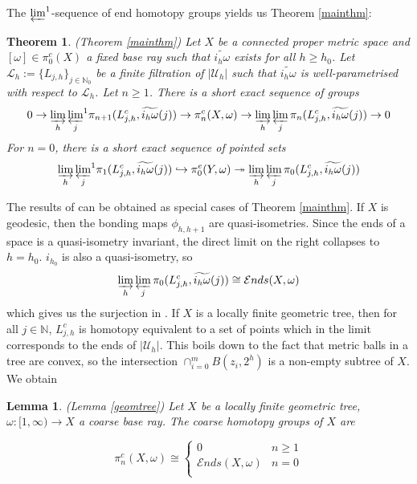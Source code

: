 \documentclass[a4paper,11pt]{article}
\theoremstyle{definition}
\theoremstyle{plain}
\newtheorem*{theorem*}{Theorem}
\newtheorem*{lemma*}{Lemma}
\theoremstyle{remark}
\begin{document}
The $\varprojlim^1$-sequence of end homotopy groups yields us Theorem \ref{mainthm}:


\begin{theorem*} (Theorem \ref{mainthm}) Let $X$ be a connected proper metric space and $[\omega]\in \pi_{0}^{c}(X)$ a fixed base ray such that $\widetilde{i_{h}\omega}$ exists for all $h\geq h_0$.  Let $\mathcal{L}_{h}:=\{L_{j,h}\}_{j\in \mathbb{N}_{0}}$ be a finite filtration of $|\mathcal{U}_{h}|$ such that $\widetilde{i_{h}\omega}$ is well-parametrised with respect to $\mathcal{L}_{h}$. Let $n\geq 1$. There is a short exact sequence of groups 
 \begin{align*}
0\rightarrow  \varinjlim_{h} {\varprojlim_{j}}^{1} \pi_{n+1}(L_{j,h}^c,\widetilde{i_{h}\omega}(j))  \rightarrow  \pi_{n}^c(X,\omega) \rightarrow  \varinjlim_{h} \varprojlim_{j} \pi_{n}(L_{j,h}^c,\widetilde{i_{h}\omega}(j)) \rightarrow 0
\end{align*}
For $n=0$, there is a short exact sequence of pointed sets
\begin{align*}
\varinjlim_{h} {\varprojlim_{j}}^{1} \pi_{1}(L_{j,h}^c,\widetilde{i_{h}\omega}(j))  \hookrightarrow \pi^{e}_{0}(Y,\omega) \twoheadrightarrow  \varinjlim_{h} \varprojlim_{j} \pi_{0}(L_{j,h}^c,\widetilde{i_{h}\omega}(j))
\end{align*}
\end{theorem*}

The results of \cite{ashley2025interactions} can be obtained as special cases of Theorem \ref{mainthm}. If $X$ is geodesic, then the bonding maps $\phi_{h,h+1}$ are quasi-isometries. Since the ends of a space is a quasi-isometry invariant, the direct limit on the right collapses to $h=h_0$. $i_{h_0}$ is also a quasi-isometry, so 
\begin{align*}
\varinjlim_{h} \varprojlim_{j} \pi_{0}(L_{j,h}^c,\widetilde{i_{h}\omega}(j))\cong \mathcal{E}nds(X,\omega)
\end{align*} 
which gives us the surjection in \cite{ashley2025interactions}. If $X$ is a locally finite geometric tree, then for all $j\in \mathbb{N}$, $L_{j,h}^c$ is homotopy equivalent to a set of points which in the limit corresponds to the ends of $|\mathcal{U}_{h}|$. This boils down to the fact that metric balls in a tree are convex, so the intersection $\cap_{i=0}^{m} B(z_i,2^h)$ is a non-empty subtree of $X$. We obtain 

\begin{lemma*} (Lemma \ref{geomtree}) Let $X$ be a locally finite geometric tree, $\omega: [1,\infty)\rightarrow X$ a coarse base ray. The coarse homotopy groups of $X$ are

\[ \pi_{n}^{c}(X,\omega) \cong \begin{cases} 
        0 & n\geq 1 \\ 
        \mathcal{E}nds(X,\omega) & n=0\\
       \end{cases}
    \]
\end{lemma*}
\end{document}
